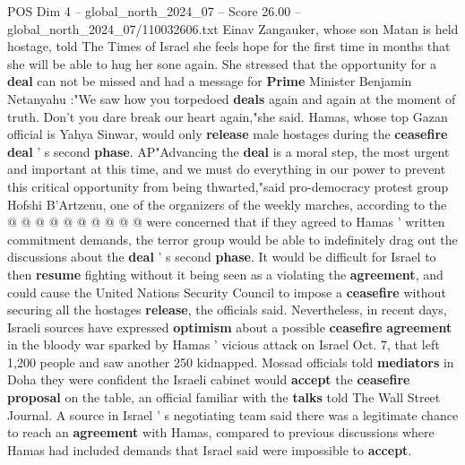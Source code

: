 \begin{textsample}{POS Dim 4 – global\_north\_2024\_07 – Score 26.00 – global\_north\_2024\_07/110032606.txt}
Einav Zangauker, whose son Matan is held hostage, told The Times of Israel she feels hope for the first time in months that she will be able to hug her sone again.
She stressed that the opportunity for a \textbf{deal} can not be missed and had a message for \textbf{Prime} Minister Benjamin Netanyahu :"We saw how you torpedoed \textbf{deals} again and again at the moment of truth.
Don't you dare break our heart again,"she said.
Hamas, whose top Gazan official is Yahya Sinwar, would only \textbf{release} male hostages during the \textbf{ceasefire} \textbf{deal} ' s second \textbf{phase}.
AP"Advancing the \textbf{deal} is a moral step, the most urgent and important at this time, and we must do everything in our power to prevent this critical opportunity from being thwarted,"said pro-democracy protest group Hofshi B'Artzenu, one of the organizers of the weekly marches, according to the @ @ @ @ @ @ @ @ @ @ were concerned that if they agreed to Hamas ' written commitment demands, the terror group would be able to indefinitely drag out the discussions about the \textbf{deal} ' s second \textbf{phase}.
It would be difficult for Israel to then \textbf{resume} fighting without it being seen as a violating the \textbf{agreement}, and could cause the United Nations Security Council to impose a \textbf{ceasefire} without securing all the hostages \textbf{release}, the officials said.
Nevertheless, in recent days, Israeli sources have expressed \textbf{optimism} about a possible \textbf{ceasefire} \textbf{agreement} in the bloody war sparked by Hamas ' vicious attack on Israel Oct. 7, that left 1,200 people and saw another 250 kidnapped.
Mossad officials told \textbf{mediators} in Doha they were confident the Israeli cabinet would \textbf{accept} the \textbf{ceasefire} \textbf{proposal} on the table, an official familiar with the \textbf{talks} told The Wall Street Journal.
A source in Israel ' s negotiating team said there was a legitimate chance to reach an \textbf{agreement} with Hamas, compared to previous discussions where Hamas had included demands that Israel said were impossible to \textbf{accept}.

\end{textsample}
